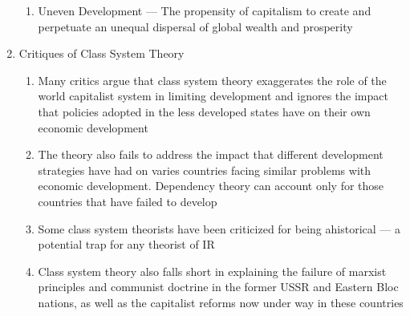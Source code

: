 \documentclass[12pt]{article}
\begin{document}
\begin{enumerate}
\begin{enumerate}
          \item Uneven Development — The propensity of capitalism to create and perpetuate an unequal dispersal of global wealth and prosperity

        \end{enumerate}

      \item Critiques of Class System Theory

        \begin{enumerate}

          \item Many critics argue that class system theory exaggerates the role of the world capitalist system in limiting development and ignores the impact that policies adopted in the less developed states have on their own economic development

          \item The theory also fails to address the impact that different development strategies have had on varies countries facing similar problems with economic development. Dependency theory can account only for those countries that have failed to develop

          \item Some class system theorists have been criticized for being ahistorical — a potential trap for any theorist of IR

          \item Class system theory also falls short in explaining the failure of marxist principles and communist doctrine in the former USSR and Eastern Bloc nations, as well as the capitalist reforms now under way in these countries

        \end{enumerate}

    \end{enumerate}
\end{document}
